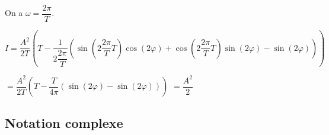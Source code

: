 On a $\omega = \dfrac{2\pi}{T}$.

$I= {\dfrac{ A^2}{2 T}\left( T -  \dfrac{1}{2\dfrac{2\pi}{T}}\left(
\sin\left( 2\dfrac{2\pi}{T} T \right)\cos\left( 2\varphi\right)
+\cos\left( 2\dfrac{2\pi}{T} T \right)\sin\left( 2\varphi\right)
- \sin\left( 2 \varphi\right)\right)  \right)}$ 

$ = \dfrac{ A^2}{2 T}\left( T -  \dfrac{T}{4\pi}\left(
\sin\left( 2\varphi\right) - \sin\left( 2 \varphi\right)\right)  \right) $
$ =\dfrac{A^2}{2}$





%
%
%
%
%

\subsection{Notation complexe}

